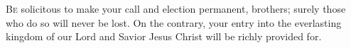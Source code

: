 
\lettrine{B}{e} solicitous to make your call and election permanent, brothers; surely those who do so will never be lost. On the contrary, your entry into the everlasting kingdom of our Lord and Savior Jesus Christ will be richly provided for.
